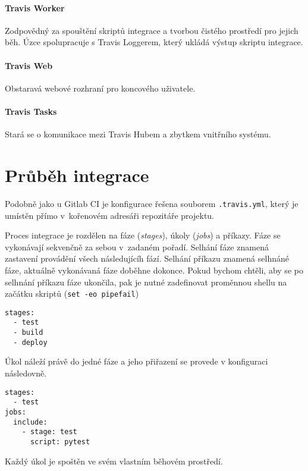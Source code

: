 \paragraph{Travis Worker}

Zodpovědný za spouštění skriptů integrace a tvorbou čistého prostředí pro jejich běh.
Úzce spolupracuje s Travis Loggerem, který ukládá výstup skriptu integrace.

\paragraph{Travis Web}

Obstaravá webové rozhraní pro koncového uživatele.

\paragraph{Travis Tasks}

Stará se o komunikace mezi Travis Hubem a zbytkem vnitřního systému.

\section{Průběh integrace}

Podobně jako u Gitlab CI je konfigurace řešena souborem \verb|.travis.yml|, který je umístěn přímo v~kořenovém adresáři repozitáře projektu.

Proces integrace je rozdělen na fáze (\textit{stages}), úkoly (\textit{jobs}) a příkazy.
Fáze se vykonávají sekvenčně za sebou v~zadaném pořadí.
Selhání fáze znamená zastavení provádění všech následujícíh fází.
Selhání příkazu znamená selhnáné fáze, aktuálně vykonávaná fáze doběhne dokonce.
Pokud bychom chtěli, aby se po selhnání příkazu fáze ukončila, pak je nutné zadefinovat proměnnou shellu na začátku skriptů (\verb|set -eo pipefail|)

\begin{verbatim}
stages:
  - test
  - build
  - deploy
\end{verbatim}

Úkol náleží právě do jedné fáze a jeho přiřazení se provede v konfiguraci následovně.

\begin{verbatim}
stages:
  - test
jobs:
  include:
    - stage: test
      script: pytest
\end{verbatim}

Každý úkol je spoštěn ve svém vlastním běhovém prostředí.

